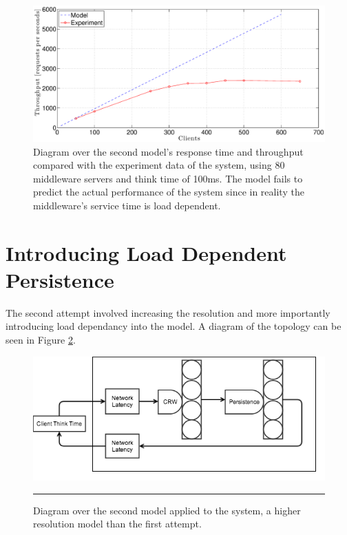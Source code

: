 \documentclass[a4paper, 11pt]{article}
\begin{document}
		\begin{figure}[cht!]
			\centering
				\includegraphics[width=1\linewidth,keepaspectratio]{firstRealAndModelFail}
			\caption{Diagram over the second model's response time and throughput compared with the experiment data of the system, using 80 middleware servers and think time of 100ms. The model fails to predict the actual performance of the system since in reality the middleware's service time is load dependent.}
			\label{fig:firstmodelResultsFail}
		\end{figure}
		\FloatBarrier


\section{Introducing Load Dependent Persistence}\label{sec:second-model}

	The second attempt involved increasing the resolution and more importantly introducing load dependancy into the model. A diagram of the topology can be seen in Figure \ref{fig:second-model}.

	\FloatBarrier
	\begin{figure}[cht!]
		\centering
			\includegraphics[width=0.8\linewidth]{secondmodel}
			\rule{35em}{0.5pt}
		\caption{Diagram over the second model applied to the system, a higher resolution model than the first attempt.}
		\label{fig:second-model}
	\end{figure}
	\FloatBarrier
\end{document}
